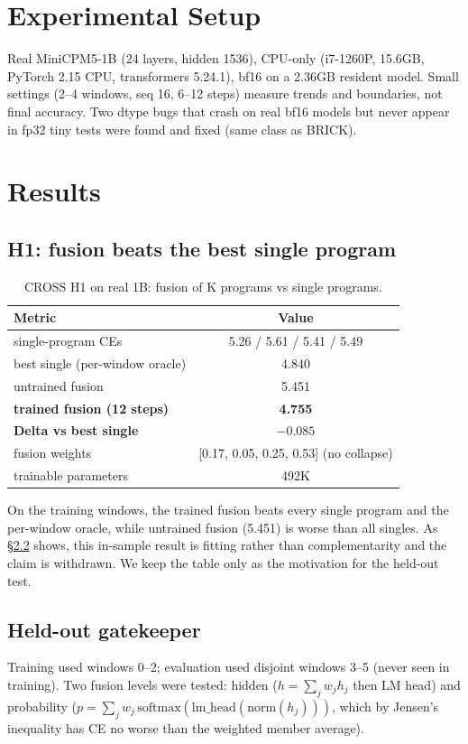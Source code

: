 \documentclass[11pt,a4paper]{article}
\begin{document}
\section{Experimental Setup}
Real MiniCPM5-1B (24 layers, hidden 1536), CPU-only (i7-1260P, 15.6GB, PyTorch
2.15 CPU, transformers 5.24.1), bf16 on a 2.36GB resident model. Small settings
(2--4 windows, seq 16, 6--12 steps) measure trends and boundaries, not final
accuracy. Two dtype bugs that crash on real bf16 models but never appear in fp32
tiny tests were found and fixed (same class as BRICK).

\section{Results}

\subsection{H1: fusion beats the best single program}
\begin{table}[h]
\centering
\begin{tabular}{lc}
\toprule
Metric & Value \\ \midrule
single-program CEs & 5.26 / 5.61 / 5.41 / 5.49 \\
best single (per-window oracle) & 4.840 \\
untrained fusion & 5.451 \\
\textbf{trained fusion (12 steps)} & \textbf{4.755} \\
\textbf{Delta vs best single} & $\mathbf{-0.085}$ \\
fusion weights & [0.17, 0.05, 0.25, 0.53] (no collapse) \\
trainable parameters & 492K \\
\bottomrule
\end{tabular}
\caption{CROSS H1 on real 1B: fusion of K programs vs single programs.}
\end{table}
On the training windows, the trained fusion beats every single program and the
per-window oracle, while untrained fusion (5.451) is worse than all singles. As
\S\ref{sec:heldout} shows, this in-sample result is fitting rather than
complementarity and the claim is withdrawn. We keep the table only as the
motivation for the held-out test.

\subsection{Held-out gatekeeper}
\label{sec:heldout}
Training used windows 0--2; evaluation used disjoint windows 3--5 (never seen in
training). Two fusion levels were tested: hidden ($h=\sum_j w_j h_j$ then LM head)
and probability ($p=\sum_j w_j\,\mathrm{softmax}(\mathrm{lm\_head}(\mathrm{norm}(h_j)))$,
which by Jensen's inequality has CE no worse than the weighted member average).
\end{document}
